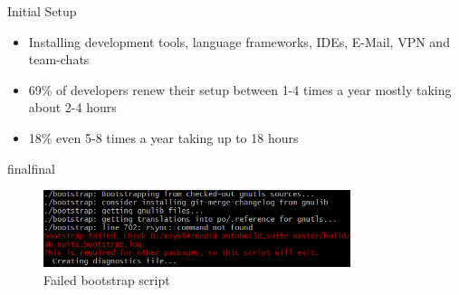 \documentclass{beamer}
\def\final{final}
\def\status{final}
\begin{document}


\begin{frame}{}
  \vspace{-0.2cm}
  \begin{center}
    \Large Initial Setup
  \end{center}

  \vspace{-0.2cm}
  \begin{block}{}
    \begin{itemize}
      \small
      \setlength\itemsep{.6em}
      \item Installing development tools, language frameworks, IDEs, E-Mail, VPN and team-chats
      \item 69\% of developers renew their setup between 1-4 times a year mostly taking about 2-4 hours
      \item 18\% even 5-8 times a year taking up to 18 hours
    \end{itemize}
  \end{block}

  \ifx\status\final{}
    \pause{}
  \fi

  \vspace{0.4cm}
  \begin{figure}
    \includegraphics[width=0.8\textwidth]{img/terminal_small.png}
    \caption{Failed bootstrap script}
  \end{figure}

\end{frame}
\end{document}
